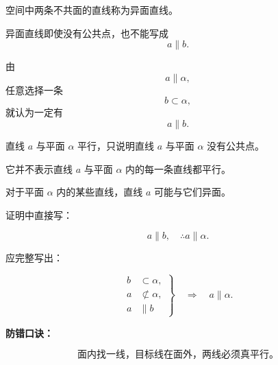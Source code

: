 \begin{trapbox}
\begin{description}[
			style=nextline,
			leftmargin=2.8em,
			labelsep=0.5em,
			itemsep=0.38em
		]
		      空间中两条不共面的直线称为异面直线。

		      异面直线即使没有公共点，也不能写成
		      \[
			      a\parallel b.
		      \]
	\end{description}

	\medskip
	\begin{description}[
			style=nextline,
			leftmargin=2.8em,
			labelsep=0.5em,
			itemsep=0.38em
		]
		\item[\textbf{\textcolor{CTrap}{易错点四：错误使用逆命题}}]

		      由
		      \[
			      a\parallel\alpha,
		      \]
		      任意选择一条
		      \[
			      b\subset\alpha,
		      \]
		      就认为一定有
		      \[
			      a\parallel b.
		      \]

		\item[\textbf{正确理解：}]

		      直线 $a$ 与平面 $\alpha$ 平行，只说明直线 $a$ 与平面 $\alpha$ 没有公共点。

		      它并不表示直线 $a$ 与平面 $\alpha$ 内的每一条直线都平行。

		      对于平面 $\alpha$ 内的某些直线，直线 $a$ 可能与它们异面。
	\end{description}

	\medskip
	\begin{description}[
			style=nextline,
			leftmargin=2.8em,
			labelsep=0.5em,
			itemsep=0.38em
		]
		\item[\textbf{\textcolor{CTrap}{易错点五：只写结论，不写定理条件}}]

		      证明中直接写：

		      \[
			      a\parallel b,
			      \quad
			      \therefore a\parallel\alpha.
		      \]

		\item[\textbf{规范写法：}]

		      应完整写出：

		      \[
			      \left.
			      \begin{aligned}
				      b & \subset\alpha,     \\
				      a & \not\subset\alpha, \\
				      a & \parallel b
			      \end{aligned}
			      \right\}
			      \quad\Longrightarrow\quad
			      a\parallel\alpha.
		      \]
	\end{description}

	\medskip
	\textbf{\textcolor{CTrap}{防错口诀：}}

	\[
		\boxed{\text{面内找一线，目标线在面外，两线必须真平行。}}
	\]
\end{trapbox}